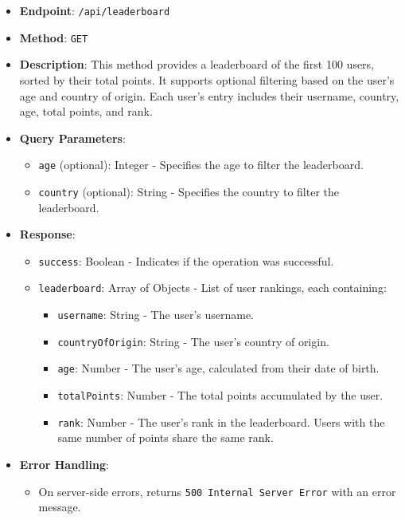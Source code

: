 \begin{itemize}
\tightlist
\item
  \textbf{Endpoint}: \texttt{/api/leaderboard}
\item
  \textbf{Method}: \texttt{GET}
\item
  \textbf{Description}: This method provides a leaderboard of the first
  100 users, sorted by their total points. It supports optional
  filtering based on the user's age and country of origin. Each user's
  entry includes their username, country, age, total points, and rank.
\item
  \textbf{Query Parameters}:

  \begin{itemize}
  \tightlist
  \item
    \texttt{age} (optional): Integer - Specifies the age to filter the
    leaderboard.
  \item
    \texttt{country} (optional): String - Specifies the country to
    filter the leaderboard.
  \end{itemize}
\item
  \textbf{Response}:

  \begin{itemize}
  \tightlist
  \item
    \texttt{success}: Boolean - Indicates if the operation was
    successful.
  \item
    \texttt{leaderboard}: Array of Objects - List of user rankings, each
    containing:

    \begin{itemize}
    \tightlist
    \item
      \texttt{username}: String - The user's username.
    \item
      \texttt{countryOfOrigin}: String - The user's country of origin.
    \item
      \texttt{age}: Number - The user's age, calculated from their date
      of birth.
    \item
      \texttt{totalPoints}: Number - The total points accumulated by the
      user.
    \item
      \texttt{rank}: Number - The user's rank in the leaderboard. Users
      with the same number of points share the same rank.
    \end{itemize}
  \end{itemize}
\item
  \textbf{Error Handling}:

  \begin{itemize}
  \tightlist
  \item
    On server-side errors, returns \texttt{500\ Internal\ Server\ Error}
    with an error message.
  \end{itemize}
\end{itemize}

